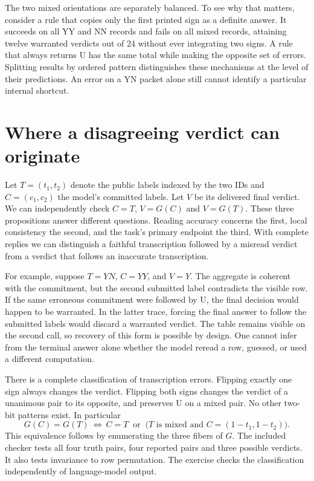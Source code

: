 \documentclass[12pt,letterpaper]{article}
\begin{document}
The two mixed orientations are separately balanced. To see why that matters, consider a rule that copies only the first printed sign as a definite answer. It succeeds on all YY and NN records and fails on all mixed records, attaining twelve warranted verdicts out of 24 without ever integrating two signs. A rule that always returns U has the same total while making the opposite set of errors. Splitting results by ordered pattern distinguishes these mechanisms at the level of their predictions. An error on a YN packet alone still cannot identify a particular internal shortcut.

\section{Where a disagreeing verdict can originate}
Let $T=(t_1,t_2)$ denote the public labels indexed by the two IDs and $C=(c_1,c_2)$ the model's committed labels. Let $V$ be its delivered final verdict. We can independently check $C=T$, $V=G(C)$ and $V=G(T)$. These three propositions answer different questions. Reading accuracy concerns the first, local consistency the second, and the task's primary endpoint the third. With complete replies we can distinguish a faithful transcription followed by a misread verdict from a verdict that follows an inaccurate transcription.

For example, suppose $T=YN$, $C=YY$, and $V=Y$. The aggregate is coherent with the commitment, but the second submitted label contradicts the visible row. If the same erroneous commitment were followed by U, the final decision would happen to be warranted. In the latter trace, forcing the final answer to follow the submitted labels would discard a warranted verdict. The table remains visible on the second call, so recovery of this form is possible by design. One cannot infer from the terminal answer alone whether the model reread a row, guessed, or used a different computation.

There is a complete classification of transcription errors. Flipping exactly one sign always changes the verdict. Flipping both signs changes the verdict of a unanimous pair to its opposite, and preserves U on a mixed pair. No other two-bit patterns exist. In particular
\[
 G(C)=G(T)\ \Longleftrightarrow\ C=T\ \text{ or }\ 
 \bigl(T\text{ is mixed and }C=(1-t_1,1-t_2)\bigr).
\]
This equivalence follows by enumerating the three fibers of $G$. The included checker tests all four truth pairs, four reported pairs and three possible verdicts. It also tests invariance to row permutation. The exercise checks the classification independently of language-model output.
\end{document}
